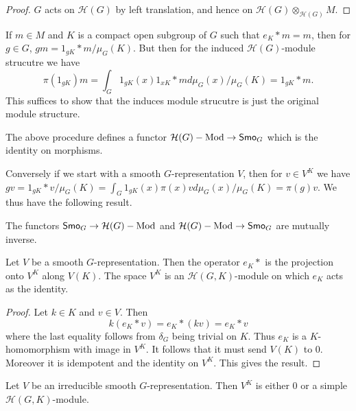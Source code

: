 \documentclass{memoir}
\begin{document}
\begin{proof}
    $G$ acts on $\mathcal H(G)$ by left translation, and hence on $\mathcal H(G)\otimes_{\mathcal H(G)}M$.
\end{proof}
\begin{remark}
    If $m\in M$ and $K$ is a compact open subgroup of $G$ such that $e_K*m = m$, then for $g\in G$, $gm = 1_{gK}*m/\mu_G(K)$.
    But then for the induced $\mathcal H(G)$-module strucutre we have
    \begin{equation}
        \pi(1_{gK})m = \int_G1_{gK}(x)1_{xK}*md\mu_G(x)/\mu_G(K) = 1_{gK}*m.
    \end{equation}
    This suffices to show that the induces module strucutre is just the original module structure.
\end{remark}
\begin{corollary}
    The above procedure defines a functor $\mathcal H(G)-\text{Mod} \to {\normalfont\mathsf{Smo}}_G$ which is the identity on morphisms.
\end{corollary}
\begin{remark}
    Conversely if we start with a smooth $G$-representation $V$, then for $v\in V^K$ we have $gv = 1_{gK}*v/\mu_G(K) = \int_G1_{gK}(x)\pi(x)vd\mu_G(x)/\mu_G(K) = \pi(g)v$.
    We thus have the following result.
\end{remark}
\begin{thm}
    The functors ${\normalfont\mathsf{Smo}}_G\to \mathcal H(G)-\text{Mod}$ and $\mathcal H(G)-\text{Mod}\to {\normalfont\mathsf{Smo}}_G$ are mutually inverse.
\end{thm}
\begin{proposition}
    Let $V$ be a smooth $G$-representation. 
    Then the operator $e_K*$ is the projection onto $V^K$ along $V(K)$.
    The space $V^K$ is an $\mathcal H(G,K)$-module on which $e_K$ acts as the identity.
\end{proposition}
\begin{proof}
    Let $k\in K$ and $v\in V$. 
    Then
    \begin{equation}
        k(e_K*v) = e_K*(kv) = e_K*v
    \end{equation}
    where the last equality follows from $\delta_G$ being trivial on $K$.
    Thus $e_K$ is a $K$-homomorphism with image in $V^K$.
    It follows that it must send $V(K)$ to $0$.
    Moreover it is idempotent and the identity on $V^K$.
    This gives the result.
\end{proof}
\begin{lemma}
    Let $V$ be an irreducible smooth $G$-representation.
    Then $V^K$ is either $0$ or a simple $\mathcal H(G,K)$-module.
\end{lemma}
\end{document}
